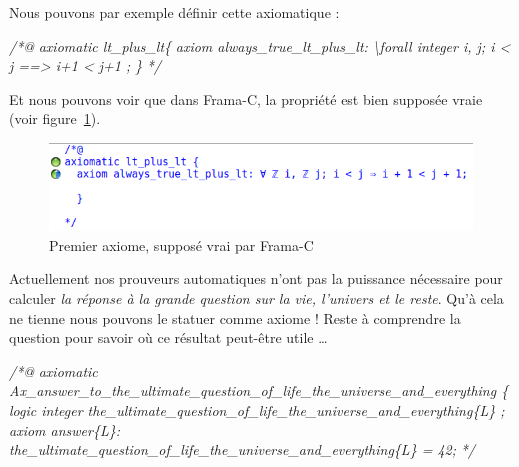 \documentclass[12pt,francais,]{scrbook}
\newenvironment{Shaded}{}{}
\newcommand{\CommentTok}[1]{\textcolor[rgb]{0.38,0.63,0.69}{\textit{{#1}}}}
\newcommand{\CommentTokAlt}[1]{\textcolor[rgb]{0.18,0.33,0.39}{\textit{{#1}}}}
\newenvironment{zdssecretblock}[1]{%
  \tcolorbox[beamer,%
    noparskip,breakable,
    colback=LightGray,colframe=DarkGray,%
    colbacklower=LightGray,%
    title=#1]
}{\endtcolorbox}
\begin{document}
Nous pouvons par exemple définir cette axiomatique :

\begin{footnotesize}\begin{Shaded}
\begin{Highlighting}[]
\CommentTok{/*@}
\CommentTok{  axiomatic lt_plus_lt\{}
\CommentTok{    axiom always_true_lt_plus_lt:}
\CommentTok{      \textbackslash{}forall integer i, j; i < j ==> i+1 < j+1 ;}
\CommentTok{  \}}
\CommentTok{*/}
\end{Highlighting}
\end{Shaded}\end{footnotesize}

Et nous pouvons voir que dans Frama-C, la propriété est bien supposée
vraie (voir figure~\ref{fig:5-1-1-fst-axiom}).

\begin{figure}[htbp]
\centering
\includegraphics[scale=0.5]{5-1-1-premier-axiome.png}
\caption{Premier axiome, supposé vrai par Frama-C}
\label{fig:5-1-1-fst-axiom}
\end{figure}

\begin{zdssecretblock}{Hors sujet}
  Actuellement nos prouveurs automatiques
  n'ont pas la puissance nécessaire pour calculer \emph{la
    réponse à la grande question sur la vie, l'univers et le 
    reste}. Qu'à cela ne tienne nous pouvons le statuer comme axiome ! Reste
  à comprendre la question pour savoir où ce résultat peut-être
  utile \ldots{}
  \begin{footnotesize}\begin{Shaded}
\begin{Highlighting}[]
\CommentTokAlt{/*@}
\CommentTokAlt{  axiomatic Ax_answer_to_the_ultimate_question_of_life_the_universe_and_everything \{}
\CommentTokAlt{    logic integer the_ultimate_question_of_life_the_universe_and_everything\{L\} ;}
\CommentTokAlt{}
\CommentTokAlt{    axiom answer\{L\}:}
\CommentTokAlt{      the_ultimate_question_of_life_the_universe_and_everything\{L\} = 42;}
\CommentTokAlt{}
\CommentTokAlt{*/}
\end{Highlighting}
    \end{Shaded}
  \end{footnotesize}
\end{zdssecretblock}
  
\end{document}
